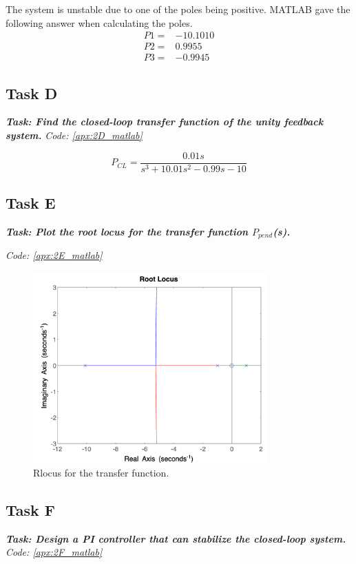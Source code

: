 The system is unstable due to one of the poles being positive.
MATLAB gave the following answer when calculating the poles.
\begin{align*}
        P1 =& -10.1010 \\
        P2 =& 0.9955 \\
        P3 =& -0.9945
\end{align*}


\subsection{Task D}
\textbf{\textit{Task:  Find the closed-loop transfer function of the unity feedback system.}}
\newline
\textit{Code: \ref{apx:2D_matlab}}

\begin{equation*}
    P_{CL} = \frac{0.01 s}{s^3 + 10.01 s^2 - 0.99 s - 10}
\end{equation*}


\subsection{Task E}
\textbf{\textit{Task: Plot the root locus for the transfer function $P_{pend}$(s).}}

\textit{Code: \ref{apx:2E_matlab}}

\begin{figure}[h!]
    \centering
    \includegraphics[width = 0.8\textwidth]{Images/2E_Rlocus.png}
    \caption{Rlocus for the transfer function.}
    \label{fig:2E_Rlocus}
\end{figure}

\subsection{Task F}
\textbf{\textit{Task: Design a PI controller that can stabilize the closed-loop system.}}
\newline
\textit{Code: \ref{apx:2F_matlab}}

